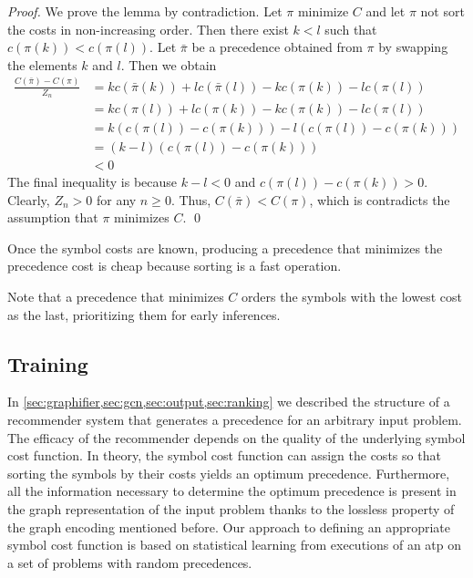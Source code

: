 \begin{proof}
We prove the lemma by contradiction.
Let $\pi$ minimize $C$ and let $\pi$ not sort the costs in non-increasing order.
Then there exist $k < l$ such that $c(\pi(k)) < c(\pi(l))$.
Let $\bar{\pi}$ be a precedence obtained from $\pi$ by swapping the elements $k$ and $l$.
Then we obtain
\begin{align*}
\frac{C(\bar{\pi}) - C(\pi)}{Z_n}
&= kc(\bar{\pi}(k)) + lc(\bar{\pi}(l)) - kc(\pi(k)) - lc(\pi(l)) \\
&= kc(\pi(l)) + lc(\pi(k)) - kc(\pi(k)) - lc(\pi(l)) \\
&= k(c(\pi(l)) - c(\pi(k))) - l(c(\pi(l)) - c(\pi(k))) \\
&= (k-l) (c(\pi(l)) - c(\pi(k))) \\
&< 0
\end{align*}
The final inequality is because $k-l < 0$ and $c(\pi(l)) - c(\pi(k)) > 0$.
Clearly, $Z_n > 0$ for any $n \geq 0$.
Thus, $C(\bar{\pi}) < C(\pi)$, which is contradicts the assumption that $\pi$ minimizes $C$. \qed
\end{proof}

Once the symbol costs are known,
producing a precedence that minimizes the precedence cost is cheap
because sorting is a fast operation.

Note that a precedence that minimizes $C$
orders the symbols with the lowest cost as the last, prioritizing them for early inferences.


\subsection{Training}
\label{sec:training}

In \cref{sec:graphifier,sec:gcn,sec:output,sec:ranking} we described the structure of a recommender system that generates a precedence for an arbitrary input problem.
The efficacy of the recommender depends on the quality of the underlying symbol cost function.
In theory, the symbol cost function can assign the costs so that
sorting the symbols by their costs yields an optimum precedence.
Furthermore, all the information necessary to determine the optimum precedence is present in the graph representation of the input problem
thanks to the lossless property of the graph encoding mentioned before.
Our approach to defining an appropriate symbol cost function is based on statistical learning
from executions of an \gls{atp} on a set of problems with random precedences.

